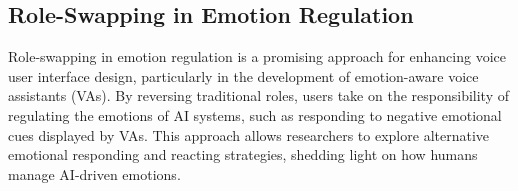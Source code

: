\subsection{Role-Swapping in Emotion Regulation}
Role-swapping in emotion regulation is a promising approach for enhancing voice user interface design, particularly in the development of emotion-aware voice assistants (VAs). By reversing traditional roles, users take on the responsibility of regulating the emotions of AI systems, such as responding to negative emotional cues displayed by VAs. This approach allows researchers to explore alternative emotional responding and reacting strategies, shedding light on how humans manage AI-driven emotions.
